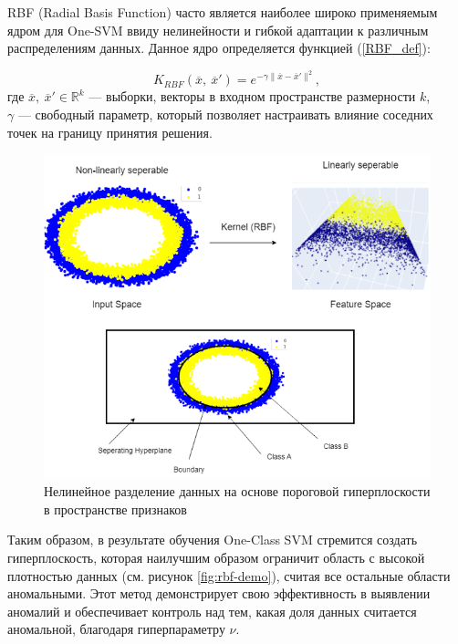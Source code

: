 \newpage

RBF (Radial Basis Function) \cite{RBF-Kernel-in-SVM} часто является наиболее широко применяемым ядром для One-SVM ввиду нелинейности и гибкой адаптации к различным распределениям данных. Данное ядро определяется функцией (\ref{RBF_def}):

\begin{equation}\label{RBF_def}
    K_{RBF}(\overline{x},\ \overline{x}') = e^{-\gamma \lVert \overline{x} - \overline{x}' \rVert^2},
\end{equation}
где $\overline{x},\ \overline{x}' \in \mathbb{R}^k$ --- выборки, векторы в входном пространстве размерности $k$, \\
$\gamma$ --- свободный параметр, который позволяет настраивать влияние соседних точек на границу принятия решения.

\begin{figure}
  \centering
  \includegraphics[scale=0.45]{inc/images/nonlinear-separation-demo.png}
  \caption{Нелинейное разделение данных на основе пороговой гиперплоскости в пространстве признаков \cite{RBF-Kernel-in-SVM}}
  \label{fig:nonlinear-separation-demo}
\end{figure}

Таким образом, в результате обучения One-Class SVM стремится создать гиперплоскость, которая наилучшим образом ограничит область с высокой плотностью данных (см. рисунок \ref{fig:rbf-demo}), считая все остальные области аномальными. Этот метод демонстрирует свою эффективность в выявлении аномалий и обеспечивает контроль над тем, какая доля данных считается аномальной, благодаря гиперпараметру $\nu$.

